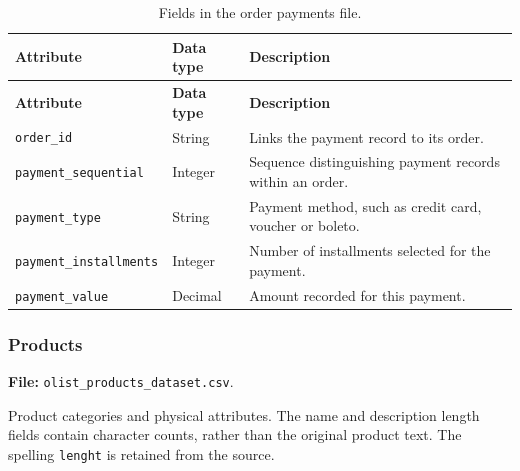 \documentclass[a4paper,12pt]{article}
\newcommand{\tablestyle}{%
  \small\setstretch{1.05}%
  \renewcommand{\arraystretch}{1.25}%
  \setlength{\extrarowheight}{3pt}%
  \arrayrulecolor{tableborder}%
}
\begin{document}
{\tablestyle
\begin{longtable}{|L{5.7cm}|L{2.1cm}|L{\dimexpr\textwidth-7.8cm-6\arrayrulewidth\relax}|}
  \caption{Fields in the order payments file.}
  \label{tab:dataset-4}\\
  \hline
  \textbf{Attribute} & \textbf{Data type} & \textbf{Description} \\[3pt]\hline
  \endfirsthead
  \hline
  \textbf{Attribute} & \textbf{Data type} & \textbf{Description} \\[3pt]\hline
  \endhead
  \endfoot
  \endlastfoot
  \nolinkurl{order_id} & String & Links the payment record to its order. \\[3pt]\hline
  \nolinkurl{payment_sequential} & Integer & Sequence distinguishing payment records within an order. \\[3pt]\hline
  \nolinkurl{payment_type} & String & Payment method, such as credit card, voucher or boleto. \\[3pt]\hline
  \nolinkurl{payment_installments} & Integer & Number of installments selected for the payment. \\[3pt]\hline
  \nolinkurl{payment_value} & Decimal & Amount recorded for this payment. \\[3pt]\hline
\end{longtable}
}

\subsubsection{Products}

\textbf{File:} \nolinkurl{olist_products_dataset.csv}.

Product categories and physical attributes. The name and description length fields contain character counts, rather than the original product text. The spelling \texttt{lenght} is retained from the source.
\end{document}
